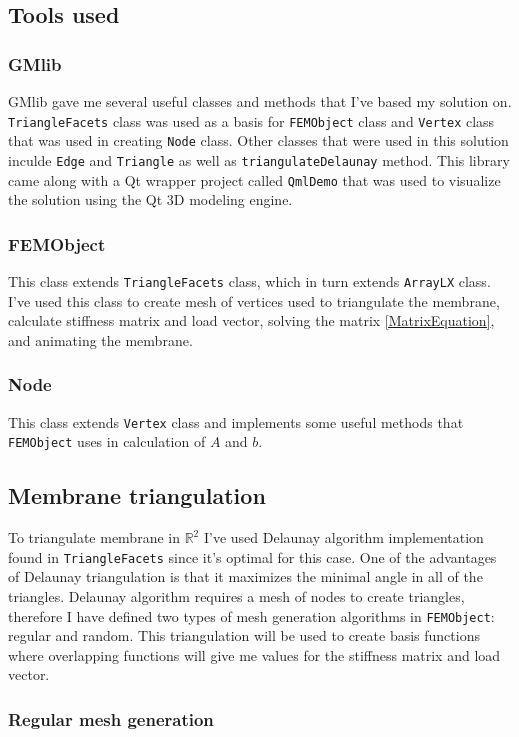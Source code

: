 \documentclass[a4,10pt]{article}
\begin{document}
\subsection{Tools used}
\subsubsection{GMlib}
GMlib gave me several useful classes and methods that I've based my solution on. \verb|TriangleFacets| class was used as a basis for \verb|FEMObject| class and \verb|Vertex| class that was used in creating \verb|Node| class. Other classes that were used in this solution inculde \verb|Edge| and \verb|Triangle| as well as \verb|triangulateDelaunay| method. This library came along with a Qt wrapper project called \verb|QmlDemo| that was used to visualize the solution using the Qt 3D modeling engine.

\subsubsection{FEMObject}
This class extends \verb|TriangleFacets| class, which in turn extends \verb|ArrayLX| class. I've used this class to create mesh of vertices used to triangulate the membrane, calculate stiffness matrix and load vector, solving the matrix \cref{MatrixEquation}, and animating the membrane.

\subsubsection{Node}
This class extends \verb|Vertex| class and implements some useful methods that \verb|FEMObject| uses in calculation of $A$ and $b$.

\subsection{Membrane triangulation}
To triangulate membrane in $\mathbb{R}^2$ I've used Delaunay algorithm implementation found in \verb|TriangleFacets| since it's optimal for this case. One of the advantages of Delaunay triangulation is that it maximizes the minimal angle in all of the triangles. Delaunay algorithm requires a mesh of nodes to create triangles, therefore I have defined two types of mesh generation algorithms in \verb|FEMObject|: regular and random. This triangulation will be used to create basis functions where overlapping functions will give me values for the stiffness matrix and load vector.

\subsubsection{Regular mesh generation}
\end{document}
